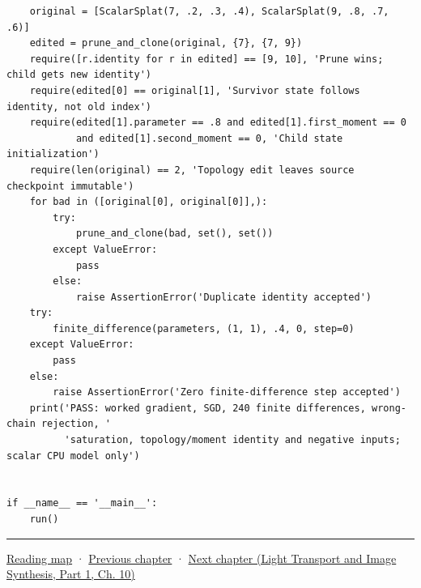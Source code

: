 \begin{verbatim}
    original = [ScalarSplat(7, .2, .3, .4), ScalarSplat(9, .8, .7, .6)]
    edited = prune_and_clone(original, {7}, {7, 9})
    require([r.identity for r in edited] == [9, 10], 'Prune wins; child gets new identity')
    require(edited[0] == original[1], 'Survivor state follows identity, not old index')
    require(edited[1].parameter == .8 and edited[1].first_moment == 0
            and edited[1].second_moment == 0, 'Child state initialization')
    require(len(original) == 2, 'Topology edit leaves source checkpoint immutable')
    for bad in ([original[0], original[0]],):
        try:
            prune_and_clone(bad, set(), set())
        except ValueError:
            pass
        else:
            raise AssertionError('Duplicate identity accepted')
    try:
        finite_difference(parameters, (1, 1), .4, 0, step=0)
    except ValueError:
        pass
    else:
        raise AssertionError('Zero finite-difference step accepted')
    print('PASS: worked gradient, SGD, 240 finite differences, wrong-chain rejection, '
          'saturation, topology/moment identity and negative inputs; scalar CPU model only')


if __name__ == '__main__':
    run()
\end{verbatim}

\begin{center}\rule{0.5\linewidth}{0.5pt}\end{center}

\hyperref[volume-reading-map]{Reading map} · \hyperref[04-visual-computing-ii-ch038-projecting-ellipsoids-into-screen-space-conics]{Previous chapter} · \href{../04-Light-Transport-and-Image-Synthesis-P01/main.pdf\#nameddest=04-visual-computing-ii-ch040-lighting-reconstruction-and-surface-motion}{Next chapter (Light Transport and Image Synthesis, Part 1, Ch. 10)}
